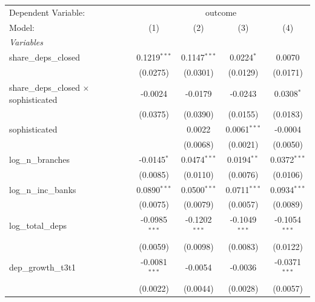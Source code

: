 \begingroup
\centering
\begin{tabular}{lcccc}
   \tabularnewline \midrule \midrule
   Dependent Variable: & \multicolumn{4}{c}{outcome}\\
   Model:                                        & (1)             & (2)             & (3)             & (4)\\  
   \midrule
   \emph{Variables}\\
   share\_deps\_closed                           & 0.1219$^{***}$  & 0.1147$^{***}$  & 0.0224$^{*}$    & 0.0070\\   
                                                 & (0.0275)        & (0.0301)        & (0.0129)        & (0.0171)\\   
   share\_deps\_closed $\times$ sophisticated    & -0.0024         & -0.0179         & -0.0243         & 0.0308$^{*}$\\   
                                                 & (0.0375)        & (0.0390)        & (0.0155)        & (0.0183)\\   
   sophisticated                                 &                 & 0.0022          & 0.0061$^{***}$  & -0.0004\\   
                                                 &                 & (0.0068)        & (0.0021)        & (0.0050)\\   
   log\_n\_branches                              & -0.0145$^{*}$   & 0.0474$^{***}$  & 0.0194$^{**}$   & 0.0372$^{***}$\\   
                                                 & (0.0085)        & (0.0110)        & (0.0076)        & (0.0106)\\   
   log\_n\_inc\_banks                            & 0.0890$^{***}$  & 0.0500$^{***}$  & 0.0711$^{***}$  & 0.0934$^{***}$\\   
                                                 & (0.0075)        & (0.0079)        & (0.0057)        & (0.0089)\\   
   log\_total\_deps                              & -0.0985$^{***}$ & -0.1202$^{***}$ & -0.1049$^{***}$ & -0.1054$^{***}$\\   
                                                 & (0.0059)        & (0.0098)        & (0.0083)        & (0.0122)\\   
   dep\_growth\_t3t1                             & -0.0081$^{***}$ & -0.0054         & -0.0036         & -0.0371$^{***}$\\   
                                                 & (0.0022)        & (0.0044)        & (0.0028)        & (0.0057)\\   

\end{tabular}
